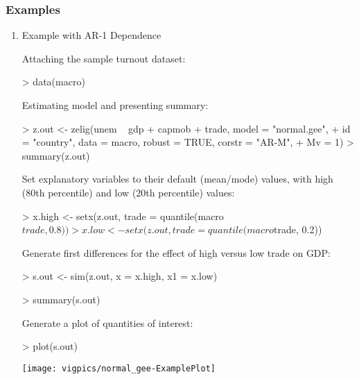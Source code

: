 \subsubsection{Examples}
\begin{enumerate}
\item {Example with AR-1 Dependence}

Attaching the sample turnout dataset:
\begin{Schunk}
\begin{Sinput}
> data(macro)
\end{Sinput}
\end{Schunk}
Estimating model and presenting summary:
\begin{Schunk}
\begin{Sinput}
> z.out <- zelig(unem ~ gdp + capmob + trade, model = "normal.gee", 
+     id = "country", data = macro, robust = TRUE, corstr = "AR-M", 
+     Mv = 1)
> summary(z.out)
\end{Sinput}
\end{Schunk}
Set explanatory variables to their default (mean/mode) values, with high (80th percentile) and low (20th percentile) values:
\begin{Schunk}
\begin{Sinput}
> x.high <- setx(z.out, trade = quantile(macro$trade, 0.8))
> x.low <- setx(z.out, trade = quantile(macro$trade, 0.2))
\end{Sinput}
\end{Schunk}
Generate first differences for the effect of high versus low trade on GDP:
\begin{Schunk}
\begin{Sinput}
> s.out <- sim(z.out, x = x.high, x1 = x.low)
\end{Sinput}
\end{Schunk}
\begin{Schunk}
\begin{Sinput}
> summary(s.out)
\end{Sinput}
\end{Schunk}
Generate a plot of quantities of interest:
\begin{center}
\begin{Schunk}
\begin{Sinput}
> plot(s.out)
\end{Sinput}
\end{Schunk}
\texttt{[image: vigpics/normal\_gee-ExamplePlot]}
\end{center}
\end{enumerate}

